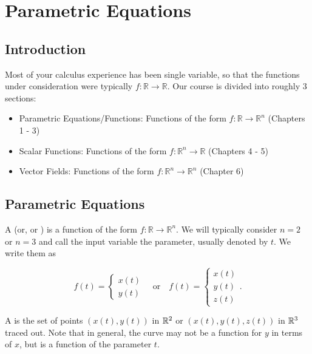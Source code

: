 \section{Parametric Equations}


\subsection{Introduction}
Most of your calculus experience has been single variable, so that the functions under consideration were typically \(f : \mathbb{R} \to \mathbb{R}\). Our course is divided into roughly 3 sections:
\begin{itemize}
    \item Parametric Equations/Functions: Functions of the form \(f : \mathbb{R} \to \mathbb{R}^n\) (Chapters 1 - 3)
    \item Scalar Functions: Functions of the form \(f : \mathbb{R}^n \to \mathbb{R}\) (Chapters 4 - 5)
    \item Vector Fields: Functions of the form \(f : \mathbb{R}^n \to \mathbb{R}^n\) (Chapter 6)
\end{itemize}

\subsection{Parametric Equations}

A  (or,  or ) is a function of the form \(f \colon \mathbb{R} \to \mathbb{R}^{n}\). We will typically consider \(n = 2\) or \(n = 3\) and call the input variable the parameter, usually denoted by \(t\). We write them as

\[
    f(t) =
    \begin{cases}
        x(t) \\
        y(t)
    \end{cases}
    \quad \text{or} \quad
    f(t) =
    \begin{cases}
        x(t) \\
        y(t) \\
        z(t)
    \end{cases}.
\]

A  is the set of points \((x(t), y(t))\) in \(\mathbb{R}^{2}\) or \((x(t), y(t), z(t))\) in \(\mathbb{R}^{3}\) traced out. Note that in general, the curve may not be a function for \(y\) in terms of \(x\), but is a function of the parameter \(t\).

